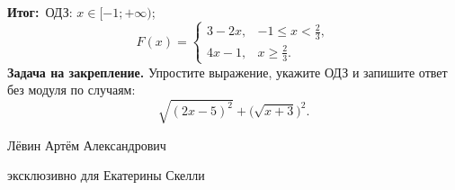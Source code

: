 \documentclass[a4paper,11pt]{article}
\newcommand{\result}{\textcolor{teal!60!black}{\textbf{Итог:}}}
\begin{document}
\result\ ОДЗ: $x\in[-1;+\infty)$;
\[
\boxed{F(x)=\begin{cases}3-2x,&-1\le x<\frac23,\\[2pt]4x-1,&x\ge\frac23.\end{cases}}
\]
\textbf{Задача на закрепление.} Упростите выражение, укажите ОДЗ и запишите ответ без модуля по случаям:
\[
\sqrt{(2x-5)^2}+\bigl(\sqrt{x+3}\bigr)^2.
\]
\vfill
\begin{center}\small Лёвин Артём Александрович\par эксклюзивно для Екатерины Скелли\end{center}
\end{document}
